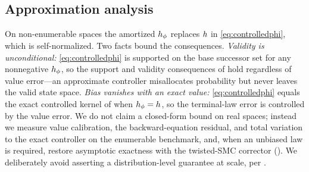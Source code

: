 \subsection{Approximation analysis}
\label{app:approx}
On non-enumerable spaces the amortized $h_\phi$ replaces $h$ in \eqref{eq:controlledphi}, which is
self-normalized. Two facts bound the consequences. \emph{Validity is unconditional:}
\eqref{eq:controlledphi} is supported on the base successor set for any nonnegative $h_\phi$, so the
support and validity consequences of  hold regardless of value error---an approximate
controller misallocates probability but never leaves the valid state space. \emph{Bias vanishes with an
exact value:} \eqref{eq:controlledphi} equals the exact controlled kernel of  when
$h_\phi=h$, so the terminal-law error is controlled by the value error. We do not claim a closed-form bound on real spaces;
instead we measure value calibration, the backward-equation residual, and total variation to the exact
controller on the enumerable benchmark, and, when an unbiased law is required, restore asymptotic
exactness with the twisted-SMC corrector (). We deliberately avoid asserting a
distribution-level guarantee at scale, per .
